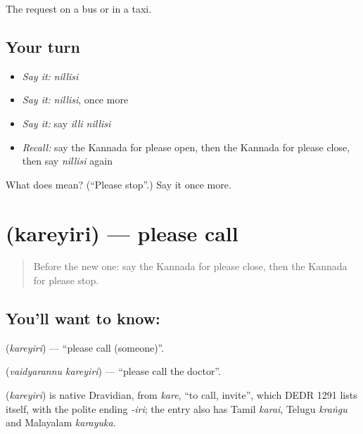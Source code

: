 \begin{grammarlens}[title={What you've built}]
The request on a bus or in a taxi.
\end{grammarlens}

\subsection*{Your turn}
\begin{itemize}
\raggedright
  \item \emph{Say it:} \emph{nillisi}
  \item \emph{Say it:} \emph{nillisi}, once more
  \item \emph{Say it:} say \emph{illi nillisi}
  \item \emph{Recall:} say the Kannada for please open, then the Kannada for please close, then say \emph{nillisi} again
\end{itemize}

\begin{tcolorbox}[breakable,colback=teal!4,colframe=teal!35!black,title={Before you move on}]
What does  mean? (\textquotedblleft{}Please stop\textquotedblright{}.) Say it once more.
\end{tcolorbox}
\section[\texorpdfstring{\kn{ಕರೆಯಿರಿ} (kareyiri)}{ಕರೆಯಿರಿ (kareyiri)}]{ (kareyiri) — please call}

\label{lesson:KA-C101-call}



\begin{quote}
Before the new one: say the Kannada for please close, then the Kannada for please stop.
\end{quote}

\subsection*{You'll want to know: }
\textbf{} (\emph{kareyiri}) — \textquotedblleft{}please call (someone)\textquotedblright{}.

\textbf{ } (\emph{vaidyarannu kareyiri}) — \textquotedblleft{}please call the doctor\textquotedblright{}.

\begin{cousinweb}
\textbf{} (\emph{kareyiri}) is native Dravidian, from \emph{kare}, \textquotedblleft{}to call, invite\textquotedblright{}, which DEDR 1291 lists itself, with the polite ending \emph{-iri}; the entry also has Tamil \emph{karai}, Telugu \emph{kraṅgu} and Malayalam \emph{karayuka}.
\end{cousinweb}

